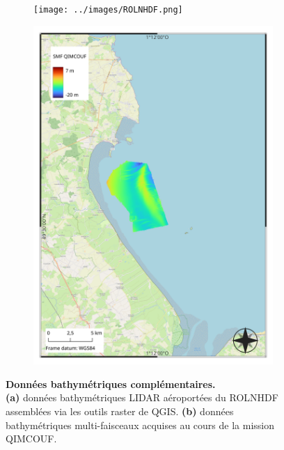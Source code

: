 \documentclass[10pt,a4paper,titlepage]{article}
\begin{document}
\begin{figure}[H]
	\centering
	\begin{subfigure}{0.45\linewidth}
		\centering
		\texttt{[image: ../images/ROLNHDF.png]}
		\caption{}
		\label{fig:ROLNHDF}
	\end{subfigure}
	\begin{subfigure}{0.45\linewidth}
		\centering
		\includegraphics[scale=0.3]{../images/QIMCOUF.png}
		\caption{}
		\label{fig:QIMCOUF}
	\end{subfigure}
	\caption{
        \textbf{Données bathymétriques complémentaires.}\\
        \textbf{(a)} données bathymétriques LIDAR aéroportées du ROLNHDF assemblées via les outils raster de QGIS. \textbf{(b)} données bathymétriques multi-faisceaux acquises au cours de la mission QIMCOUF.}
\end{figure}
\end{document}
